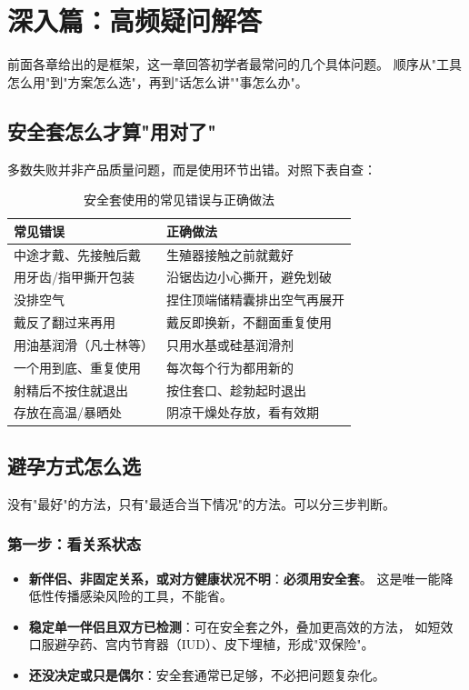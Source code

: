 \chapter{深入篇：高频疑问解答}
\label{chap:faq}

前面各章给出的是框架，这一章回答初学者最常问的几个具体问题。
顺序从"工具怎么用"到"方案怎么选"，再到"话怎么讲""事怎么办"。

\section{安全套怎么才算"用对了"}

多数失败并非产品质量问题，而是使用环节出错。对照下表自查：

\begin{table}[htbp]
  \centering
  \caption{安全套使用的常见错误与正确做法}
  \begin{tabularx}{\textwidth}{@{}X X@{}}
    \toprule
    \textbf{常见错误} & \textbf{正确做法} \\
    \midrule
    中途才戴、先接触后戴 & 生殖器接触之前就戴好 \\
    用牙齿/指甲撕开包装   & 沿锯齿边小心撕开，避免划破 \\
    没排空气               & 捏住顶端储精囊排出空气再展开 \\
    戴反了翻过来再用       & 戴反即换新，不翻面重复使用 \\
    用油基润滑（凡士林等） & 只用水基或硅基润滑剂 \\
    一个用到底、重复使用   & 每次每个行为都用新的 \\
    射精后不按住就退出     & 按住套口、趁勃起时退出 \\
    存放在高温/暴晒处      & 阴凉干燥处存放，看有效期 \\
    \bottomrule
  \end{tabularx}
\end{table}

\section{避孕方式怎么选}

没有"最好"的方法，只有"最适合当下情况"的方法。可以分三步判断。

\subsection*{第一步：看关系状态}

\begin{itemize}
  \item \textbf{新伴侣、非固定关系，或对方健康状况不明}：\textbf{必须用安全套}。
        这是唯一能降低性传播感染风险的工具，不能省。
  \item \textbf{稳定单一伴侣且双方已检测}：可在安全套之外，叠加更高效的方法，
        如短效口服避孕药、宫内节育器（IUD）、皮下埋植，形成"双保险"。
  \item \textbf{还没决定或只是偶尔}：安全套通常已足够，不必把问题复杂化。
\end{itemize}

